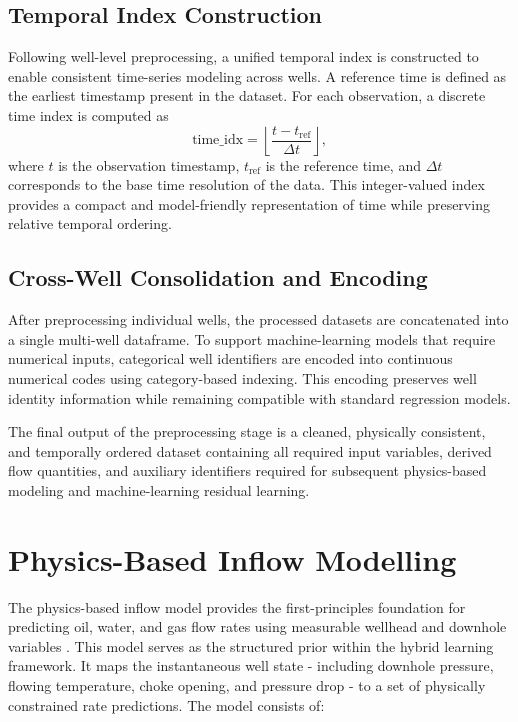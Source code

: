 \documentclass[12pt,APA]{uomthesis}
\begin{document}
\subsection{Temporal Index Construction}
Following well-level preprocessing, a unified temporal index is constructed to enable consistent time-series modeling across wells. A reference time is defined as the earliest timestamp present in the dataset. For each observation, a discrete time index is computed as
\begin{equation}
\text{time\_idx} =
\left\lfloor
\frac{t - t_{\text{ref}}}{\Delta t}
\right\rfloor,
\end{equation}
where $t$ is the observation timestamp, $t_{\text{ref}}$ is the reference time, and $\Delta t$ corresponds to the base time resolution of the data. This integer-valued index provides a compact and model-friendly representation of time while preserving relative temporal ordering.

\subsection{Cross-Well Consolidation and Encoding}
After preprocessing individual wells, the processed datasets are concatenated into a single multi-well dataframe. To support machine-learning models that require numerical inputs, categorical well identifiers are encoded into continuous numerical codes using category-based indexing. This encoding preserves well identity information while remaining compatible with standard regression models.

The final output of the preprocessing stage is a cleaned, physically consistent, and temporally ordered dataset containing all required input variables, derived flow quantities, and auxiliary identifiers required for subsequent physics-based modeling and machine-learning residual learning.

\section{Physics-Based Inflow Modelling}
\label{sec:physics_model}
The physics-based inflow model provides the first-principles foundation for predicting
oil, water, and gas flow rates using measurable wellhead and downhole variables \citep{ahmed2010reservoir}.
This model serves as the structured prior within the hybrid learning framework.
It maps the instantaneous well state - including downhole pressure, flowing temperature,
choke opening, and pressure drop - to a set of physically constrained rate predictions.
The model consists of:
\end{document}
